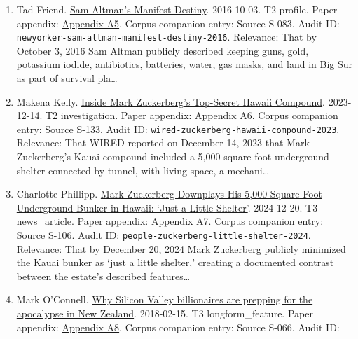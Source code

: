 \documentclass[
  american,
  11pt,
  letterpaper,
]{article}
\begin{document}
\begin{enumerate}
  \texttt{imf-gen-ai-future-of-work-2024}. Relevance: That labor-market
  exposure to generative AI is systematically uneven across geography,
  occupation, and class position.
\item
  Tad Friend.
  \href{https://www.newyorker.com/magazine/2016/10/10/sam-altmans-manifest-destiny}{Sam
  Altman's Manifest Destiny}. 2016-10-03. T2 profile. Paper appendix:
  \hyperref[appendix-a5-sam-altman-s-manifest-destiny]{Appendix A5}.
  Corpus companion entry: Source S-083. Audit ID:
  \texttt{newyorker-sam-altman-manifest-destiny-2016}. Relevance: That
  by October 3, 2016 Sam Altman publicly described keeping guns, gold,
  potassium iodide, antibiotics, batteries, water, gas masks, and land
  in Big Sur as part of survival pla\ldots{}
\item
  Makena Kelly.
  \href{https://www.wired.com/story/mark-zuckerberg-inside-hawaii-compound}{Inside
  Mark Zuckerberg's Top-Secret Hawaii Compound}. 2023-12-14. T2
  investigation. Paper appendix:
  \hyperref[appendix-a6-inside-mark-zuckerbergs-top-secret-hawaii-compound]{Appendix
  A6}. Corpus companion entry: Source S-133. Audit ID:
  \texttt{wired-zuckerberg-hawaii-compound-2023}. Relevance: That WIRED
  reported on December 14, 2023 that Mark Zuckerberg's Kauai compound
  included a 5,000-square-foot underground shelter connected by tunnel,
  with living space, a mechani\ldots{}
\item
  Charlotte Phillipp.
  \href{https://people.com/mark-zuckerberg-hawaii-bunker-5000-square-feet-8765376}{Mark
  Zuckerberg Downplays His 5,000-Square-Foot Underground Bunker in
  Hawaii: `Just a Little Shelter'}. 2024-12-20. T3 news\_article. Paper
  appendix:
  \hyperref[appendix-a7-mark-zuckerberg-downplays-his-5-000-square-foot-underground-bunker-in-hawaii-just-a-little-shelter]{Appendix
  A7}. Corpus companion entry: Source S-106. Audit ID:
  \texttt{people-zuckerberg-little-shelter-2024}. Relevance: That by
  December 20, 2024 Mark Zuckerberg publicly minimized the Kauai bunker
  as `just a little shelter,' creating a documented contrast between the
  estate's described features\ldots{}
\item
  Mark O'Connell.
  \href{https://www.theguardian.com/news/2018/feb/15/why-silicon-valley-billionaires-are-prepping-for-the-apocalypse-in-new-zealand}{Why
  Silicon Valley billionaires are prepping for the apocalypse in New
  Zealand}. 2018-02-15. T3 longform\_feature. Paper appendix:
  \hyperref[appendix-a8-why-silicon-valley-billionaires-are-prepping-for-the-apocalypse-in-new-zealand]{Appendix
  A8}. Corpus companion entry: Source S-066. Audit ID:

\end{enumerate}
\end{document}
